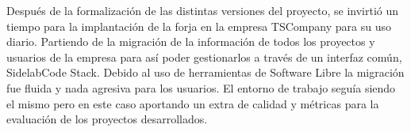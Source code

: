 \par Despu\'es de la formalizaci\'on de las distintas versiones del proyecto, se invirti\'o un tiempo para la implantaci\'on de la forja en la empresa TSCompany para su uso diario. Partiendo de la migraci\'on de la informaci\'on de todos los proyectos y usuarios de la empresa para as\'i poder gestionarlos a trav\'es de un interfaz com\'un, SidelabCode Stack. Debido al uso de herramientas de Software Libre la migraci\'on fue fluida y nada agresiva para los usuarios. El entorno de trabajo segu\'ia siendo el mismo pero en este caso aportando un extra de calidad y m\'etricas para la evaluaci\'on de los proyectos desarrollados.

